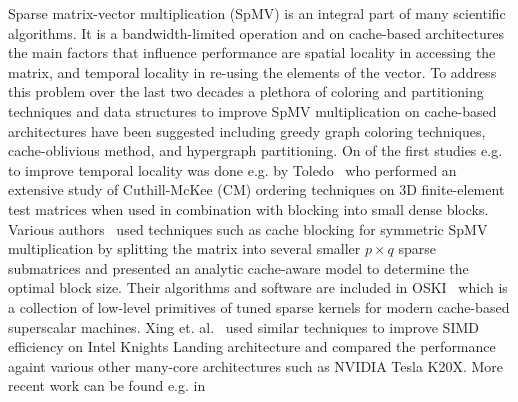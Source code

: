 


Sparse matrix-vector multiplication (SpMV) is an integral part of many scientific algorithms. It is a bandwidth-limited operation and on cache-based architectures the main factors that influence performance are spatial locality in accessing the matrix, and temporal locality in re-using the elements of the vector. To address this problem over the last two decades a plethora of coloring and partitioning techniques and data structures to improve SpMV multiplication on cache-based architectures have been suggested including greedy graph coloring techniques, cache-oblivious method, and hypergraph partitioning. On of the first studies e.g. to improve temporal locality was done e.g. by Toledo~\cite{Toledo:1997:IMP:279511.279532} who performed an extensive study of Cuthill-McKee (CM) ordering techniques on 3D finite-element test matrices when used in combination with blocking into small dense blocks. Various authors~\cite{Buluc:2011:RMA:2058524.2059503,Williams:2009:OSM:1513001.1513318,doi:10.1177/1094342004041296} used techniques such as cache blocking for symmetric SpMV multiplication by splitting the matrix into several smaller $p \times q$ sparse submatrices and presented an analytic cache-aware model to determine the optimal block size. Their algorithms and software are included in OSKI~\cite{1742-6596-16-1-071} which is a collection of low-level primitives of tuned sparse kernels for modern cache-based superscalar machines. Xing et. al.~\cite{Liu:2013:ESM:2464996.2465013} used similar techniques to improve SIMD efficiency on Intel Knights Landing architecture
and compared the performance againt various other many-core architectures such as NVIDIA Tesla K20X. More recent work can be found e.g. in~\cite{Buluc:2011:RMA:2058524.2059503,Liu:2015:CES:2751205.2751209}


